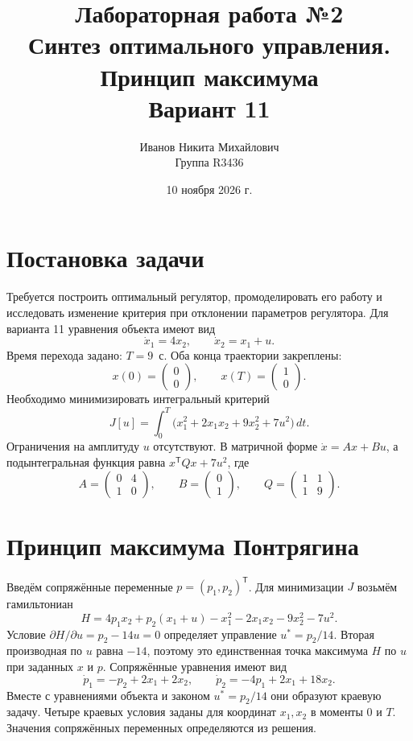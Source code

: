 \documentclass[12pt,a4paper]{article}
\title{Лабораторная работа №2\\
Синтез оптимального управления. Принцип максимума\\
Вариант 11}
\author{Иванов Никита Михайлович\\Группа R3436}
\date{10 ноября 2026 г.}
\begin{document}
\maketitle
\newpage
\tableofcontents
\newpage

\section{Постановка задачи}
Требуется построить оптимальный регулятор, промоделировать его работу
и исследовать изменение критерия при отклонении параметров регулятора.
Для варианта 11 уравнения объекта имеют вид
\begin{equation}
  \dot{x}_1=4x_2,\qquad \dot{x}_2=x_1+u .
\end{equation}
Время перехода задано: $T=9$~с. Оба конца траектории закреплены:
\[
  x(0)=\begin{pmatrix}0\\0\end{pmatrix},\qquad
  x(T)=\begin{pmatrix}1\\0\end{pmatrix}.
\]
Необходимо минимизировать интегральный критерий
\begin{equation}
  J[u]=\int_0^T\bigl(x_1^2+2x_1x_2+9x_2^2+7u^2\bigr)\,dt .
\end{equation}
Ограничения на амплитуду $u$ отсутствуют. В матричной форме
$\dot x=Ax+Bu$, а подынтегральная функция равна $x^{\mathsf T}Qx+7u^2$, где
\[
  A=\begin{pmatrix}0&4\\1&0\end{pmatrix},\qquad
  B=\begin{pmatrix}0\\1\end{pmatrix},\qquad
  Q=\begin{pmatrix}1&1\\1&9\end{pmatrix}.
\]

\section{Принцип максимума Понтрягина}
Введём сопряжённые переменные $p=(p_1,p_2)^{\mathsf T}$.
Для минимизации $J$ возьмём гамильтониан
\begin{equation}
  H=4p_1x_2+p_2(x_1+u)-x_1^2-2x_1x_2-9x_2^2-7u^2 .
\end{equation}
Условие $\partial H/\partial u=p_2-14u=0$ определяет
управление $u^*=p_2/14$. Вторая производная по $u$ равна $-14$,
поэтому это единственная точка максимума $H$ по $u$ при заданных $x$ и $p$.
Сопряжённые уравнения имеют вид
\begin{equation}
  \dot p_1=-p_2+2x_1+2x_2,\qquad
  \dot p_2=-4p_1+2x_1+18x_2 .
\end{equation}
Вместе с уравнениями объекта и законом $u^*=p_2/14$ они образуют
краевую задачу. Четыре краевых условия заданы для координат $x_1,x_2$
в моменты $0$ и $T$. Значения сопряжённых переменных определяются из решения.
\end{document}
